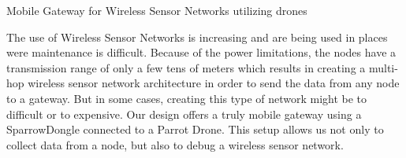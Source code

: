 Mobile Gateway for Wireless Sensor Networks utilizing drones

The use of Wireless Sensor Networks is increasing and are being used in places were maintenance is difficult. Because of the power limitations, the nodes have a transmission range of only a few tens of meters which results in creating a multi-hop wireless sensor network architecture in order to send the data from any node to a gateway. But in some cases, creating this type of network might be to difficult or to expensive. Our design offers a truly mobile gateway using a SparrowDongle connected to a Parrot Drone. This setup allows us not only to collect data from a node, but also to debug a wireless sensor network.


